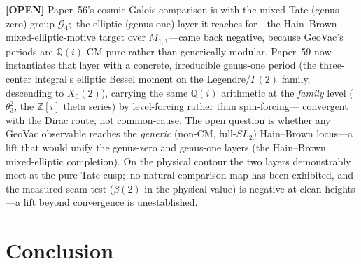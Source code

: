 \documentclass[aps,pra,twocolumn,superscriptaddress,longbibliography]{revtex4-2}
\begin{document}
\textbf{[OPEN]} Paper~56's cosmic-Galois comparison is with the mixed-Tate (genus-zero) group
$\mathcal{G}_4$;\ the elliptic (genus-one) layer it reaches for---the
Hain--Brown mixed-elliptic-motive target over $M_{1,1}$---came back negative,
because GeoVac's periods are $\mathbb{Q}(i)$-CM-pure rather than generically
modular.  Paper~59 now instantiates that layer with a concrete, irreducible
genus-one period (the three-center integral's elliptic Bessel moment on the
Legendre/$\Gamma(2)$ family, descending to $X_0(2)$), carrying the same
$\mathbb{Q}(i)$ arithmetic at the \emph{family} level ($\theta_3^2$, the
$\mathbb{Z}[i]$ theta series) by level-forcing rather than spin-forcing---%
convergent with the Dirac route, not common-cause.  The open question is whether
any GeoVac observable reaches the \emph{generic} (non-CM, full-$SL_2$)
Hain--Brown locus---a lift that would unify the genus-zero and genus-one layers
(the Hain--Brown mixed-elliptic completion).  On the physical contour the two
layers demonstrably meet at the pure-Tate cusp;\ no natural comparison map has
been exhibited, and the measured seam test ($\beta(2)$ in the physical value)
is negative at clean heights---a lift beyond convergence is unestablished.

\section{Conclusion}
\label{sec:conclusion}
\end{document}
